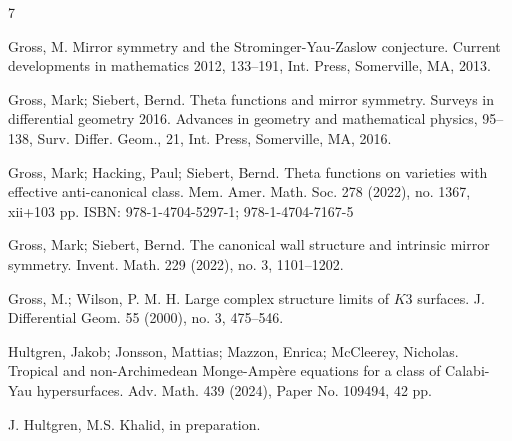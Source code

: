 \documentclass[a4paper]{article}
\theoremstyle{definition}
\begin{document}
\begin{thebibliography}{7}
			
			
			Gross, M. Mirror symmetry and the Strominger-Yau-Zaslow conjecture. Current developments in mathematics 2012, 133--191, Int. Press, Somerville, MA, 2013. 
			
			
			
			
			
			
			Gross, Mark; Siebert, Bernd. Theta functions and mirror symmetry. Surveys in differential geometry 2016. Advances in geometry and mathematical physics, 95--138, Surv. Differ. Geom., 21, Int. Press, Somerville, MA, 2016. 
			
			
			Gross, Mark; Hacking, Paul; Siebert, Bernd. Theta functions on varieties with effective anti-canonical class. Mem. Amer. Math. Soc. 278 (2022), no. 1367, xii+103 pp. ISBN: 978-1-4704-5297-1; 978-1-4704-7167-5
			
			Gross, Mark; Siebert, Bernd. The canonical wall structure and intrinsic mirror symmetry. Invent. Math. 229 (2022), no. 3, 1101--1202.
			
			
			
			
			
		Gross, M.; Wilson, P. M. H. Large complex structure limits of $K3$ surfaces. J. Differential Geom. 55 (2000), no. 3, 475--546.
			
			

			
			
			
			
			
			
			
			
			
			
			Hultgren, Jakob; Jonsson, Mattias; Mazzon, Enrica; McCleerey, Nicholas. Tropical and non-Archimedean Monge-Ampère equations for a class of Calabi-Yau hypersurfaces. Adv. Math. 439 (2024), Paper No. 109494, 42 pp.
			
			
			
			
	 J. Hultgren, M.S. Khalid, in preparation.
			
			
			

\end{thebibliography}
\end{document}
